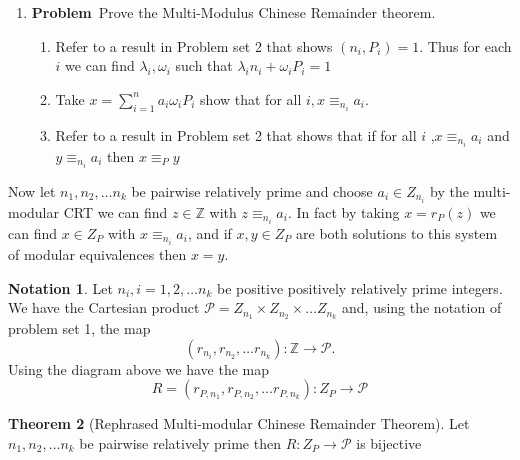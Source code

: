 \documentclass[12pt]{amsart}
\newcommand{\benu}{\begin{enumerate}}
\newcommand{\eenu}{\end{enumerate}}
\theoremstyle{definition}
\newtheorem{theorem}{Theorem}
\newtheorem{notation}[theorem]{Notation}
\newcommand{\bnot}{\begin{notation}}
\newcommand{\enot}{\end{notation}}
\newcommand{\bet}{\begin{theorem}}
\newcommand{\et}{\end{theorem}}
\newcommand{\mbZ}{\mathbb{Z}}
\newcommand{\mb}[1]{\mathbb{#1}}
\newcommand{\mc}[1]{\mathcal{#1}}
\newcommand{\itep}{\item {\bfseries Problem}\ }
\begin{document}
\begin{enumerate}[resume=p]
\itep Prove the Multi-Modulus Chinese Remainder theorem.
 
\benu 
\item Refer to a result in Problem set 2 that shows $(n_i,P_i)=1$. Thus for each $i$ we can find $\lambda_i,\omega_i$ such that $\lambda_in_i+\omega_iP_i=1$

\begin{comment}
This follows from Problem Set 2 Problem 3a
\end{comment}
\item Take $x=\sum_{i=1}^na_i\omega_iP_i$ show that for all $i, x\equiv_{n_i}a_i$.
\begin{comment} For all $i$ we have  $a_i\omega_iP_i\equiv_{n_i} a_i$ and for $j\neq i,n_j|P_i$ so $a_i\omega P_i\equiv_{n_j}0$. Hence for all $i$, $a_i\omega_{i}P_i+\sum_{j\neq i}a_j\omega_jP_j=x\equiv_{n_i} a_i$.
\end{comment}
\item Refer to a result in Problem set 2 that shows that if for all $i$ ,$x\equiv_{n_i}a_i$ and $y\equiv_{n_i} a_i$ then $x\equiv_P y$
\begin{comment} Suppose that for all $i$ we have $x\equiv_{n_i}a_i$ and $y\equiv_{n_i} a_i$. Then for all $i, x-y\equiv_{n_i}0$. That is for all $i$ we have $n_i|(x-y)$. Since the $n_i$ are pairwise relatively prime, by Problem set 2 Problem 2d $P|(x-y)$.
\end{comment}
\eenu
\end{enumerate} 
Now let $n_1,n_2,\dots n_k$ be pairwise relatively prime and choose $a_i\in Z_{n_i}$ by the multi-modular CRT we can find $z\in \mb{Z}$ with $z\equiv_{n_i}a_i$. In fact by taking $x=r_{P}(z)$ we can find $x\in Z_{P}$ with $x\equiv_{n_i}a_i$, and if 
$x,y\in Z_{P}$ are both solutions to this system of modular equivalences then $x=y$.

\bnot
Let $n_i,i=1,2,\dots n_k$ be  positive positively relatively prime integers.  We have the Cartesian product $\mc{P}=Z_{n_1}\times Z_{n_2}\times\dots Z_{n_k}$ and, using the notation of problem set 1, the map \[(r_{n_i},r_{n_2},\dots r_{n_k})\colon \mbZ\to \mc{P}.\] Using the diagram above we have the map
\[R=(r_{P,n_1},r_{P,n_2},\dots r_{P,n_k})\colon Z_P\to \mc{P}\]
\enot
\bet[Rephrased Multi-modular Chinese Remainder Theorem] Let $n_1,n_2,\dots n_k$ be pairwise relatively prime then $R\colon Z_P\to \mc{P}$ is bijective
\et
\end{document}
